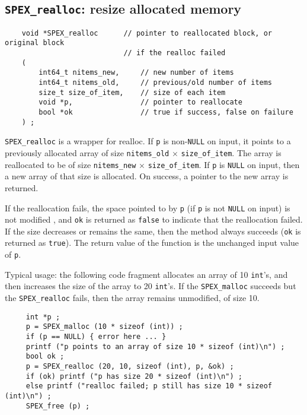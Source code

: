 \documentclass[12pt,oneside]{book}
\theoremstyle{definition}
\begin{document}
\subsection{\texttt{SPEX\_realloc}: resize allocated memory} \label{ss:SPEX_realloc}
\begin{mdframed}[userdefinedwidth=\textwidth]
{\footnotesize
\begin{verbatim}
    void *SPEX_realloc      // pointer to reallocated block, or original block
                            // if the realloc failed
    (
        int64_t nitems_new,     // new number of items
        int64_t nitems_old,     // previous/old number of items
        size_t size_of_item,    // size of each item
        void *p,                // pointer to reallocate
        bool *ok                // true if success, false on failure
    ) ;
\end{verbatim}
} \end{mdframed}

\verb|SPEX_realloc| is a wrapper for realloc.  If \verb|p| is non-\verb|NULL| on
input, it points to a previously allocated array of size \verb|nitems_old|
$\times$ \verb|size_of_item|.  The array is reallocated to be of size
\verb|nitems_new| $\times$ \verb|size_of_item|.  If \verb|p| is \verb|NULL| on input,
then a new array of that size is allocated.  On success, a pointer to the new
array is returned. 

If the reallocation fails, the space pointed to by \verb|p| (if \verb'p' is not \verb'NULL' on input) is not modified
, and \verb|ok| is returned
as \verb|false| to indicate that the reallocation failed.  If the size
decreases or remains the same, then the method always succeeds (\verb|ok| is
returned as \verb|true|).  The return value of the function is
the unchanged input value of \verb'p'.

Typical usage:  the following code fragment allocates an array of 10
\verb|int|'s, and then increases the size of the array to 20 \verb|int|'s.  If
the \verb|SPEX_malloc| succeeds but the \verb|SPEX_realloc| fails, then the
array remains unmodified, of size 10.

\begin{mdframed}[userdefinedwidth=\textwidth]
{\footnotesize
\begin{verbatim}
     int *p ;
     p = SPEX_malloc (10 * sizeof (int)) ;
     if (p == NULL) { error here ... }
     printf ("p points to an array of size 10 * sizeof (int)\n") ;
     bool ok ;
     p = SPEX_realloc (20, 10, sizeof (int), p, &ok) ;
     if (ok) printf ("p has size 20 * sizeof (int)\n") ;
     else printf ("realloc failed; p still has size 10 * sizeof (int)\n") ;
     SPEX_free (p) ;
\end{verbatim}
} \end{mdframed}
\end{document}
